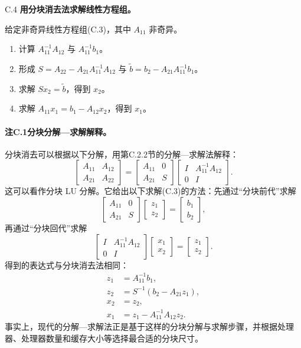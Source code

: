 \begin{origalgorithm}{C.4}
\textbf{用分块消去法求解线性方程组。}

给定非奇异线性方程组(C.3)，其中 $A_{11}$ 非奇异。
\begin{enumerate}
\item 计算 $A_{11}^{-1}A_{12}$ 与 $A_{11}^{-1}b_1$。
\item 形成 $S=A_{22}-A_{21}A_{11}^{-1}A_{12}$ 与 $\widetilde b=b_2-A_{21}A_{11}^{-1}b_1$。
\item 求解 $Sx_2=\widetilde b$，得到 $x_2$。
\item 求解 $A_{11}x_1=b_1-A_{12}x_2$，得到 $x_1$。
\end{enumerate}
\end{origalgorithm}

\paragraph{注C.1\quad 分块分解—求解解释。}
分块消去可以根据以下分解，用第C.2.2节的分解—求解法解释：
\[
 \begin{bmatrix}A_{11}&A_{12}\\A_{21}&A_{22}\end{bmatrix}
 =\begin{bmatrix}A_{11}&0\\A_{21}&S\end{bmatrix}
 \begin{bmatrix}I&A_{11}^{-1}A_{12}\\0&I\end{bmatrix}.
\]
这可以看作分块 LU 分解。它给出以下求解(C.3)的方法：先通过“分块前代”求解
\[
 \begin{bmatrix}A_{11}&0\\A_{21}&S\end{bmatrix}
 \begin{bmatrix}z_1\\z_2\end{bmatrix}=\begin{bmatrix}b_1\\b_2\end{bmatrix},
\]
再通过“分块回代”求解
\[
 \begin{bmatrix}I&A_{11}^{-1}A_{12}\\0&I\end{bmatrix}
 \begin{bmatrix}x_1\\x_2\end{bmatrix}=\begin{bmatrix}z_1\\z_2\end{bmatrix}.
\]
得到的表达式与分块消去法相同：
\begin{align*}
 z_1&=A_{11}^{-1}b_1,\\
 z_2&=S^{-1}(b_2-A_{21}z_1),\\
 x_2&=z_2,\\
 x_1&=z_1-A_{11}^{-1}A_{12}z_2.
\end{align*}
事实上，现代的分解—求解法正是基于这样的分块分解与求解步骤，并根据处理器、处理器数量和缓存大小等选择最合适的分块尺寸。

